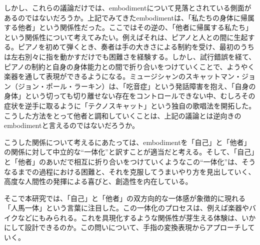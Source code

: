 しかし、これらの議論だけでは、embodimentについて見落とされている側面があるのではないだろうか。上記でみてきたembodimentは、「私たちの身体に帰属する他者」という関係性だった。ここではその逆の、「他者に帰属する私たち」という関係性について考えてみたい。例えばそれは、ピアノと人との間に生起する。ピアノを初めて弾くとき、奏者は手の大きさによる制約を受け、最初のうちは左右別々に指を動かすだけでも困難さを経験する。しかし、試行錯誤を経て、ピアノの制約と自身の身体能力との間で折り合いをつけていくことで、ようやく楽器を通して表現ができるようになる。ミュージシャンのスキャットマン・ジョン（ジョン・ポール・ラーキン）は、「吃音症」という発話障害を抱え、「自身の身体」という切っても切り離せない存在をコントロールできない中、むしろその症状を逆手に取るように「テクノスキャット」という独自の歌唱法を開拓した。こうした方法をとって他者と調和していくことは、上記の議論とは逆向きのembodimentと言えるのではないだろうか。

こうした関係について考えるにあたっては、embodimentを「自己」と「他者」の関係に対して中立的な``一体化''と訳すことが適当だと考える。そして、「自己」と「他者」のあいだで相互に折り合いをつけていくようなこの``一体化''は、そうなるまでの過程における困難と、それを克服してうまいやり方を見出していく、高度な人間性の発揮による喜びと、創造性を内在している。

そこで本研究では、「自己」と「他者」の双方向的な一体感が象徴的に現れる「人馬一体」という言葉に注目した。この一体化のプロセスは、例えば楽器やバイクなどにもみられる。これを具現化するような関係性が芽生える体験は、いかにして設計できるのか。この問いについて、手指の変換表現からアプローチしていく。




